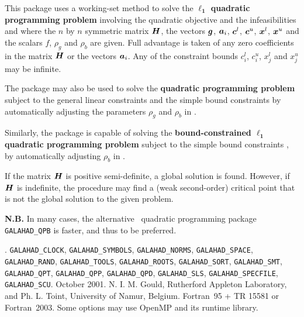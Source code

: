 \documentclass{galahad}
\newcommand{\packagename}{QPA}
\newcommand{\fullpackagename}{\libraryname\_\packagename}
\begin{document}
\galheader


\galsummary
This package uses a working-set method
to solve the {\bf $\mathbf{\ell_1}$ quadratic programming problem}
involving the quadratic objective
and the infeasibilities
and
where the $n$ by $n$ symmetric matrix ${\bm{H}}$, the 
vectors ${\bm{g}}$, ${\bm{a}}_{i}$, ${\bm{c}}^{l}$, ${\bm{c}}^{u}$, ${\bm{x}}^{l}$, ${\bm{x}}^{u}$ 
and the scalars $f$, $\rho_g$ and $\rho_b$ are given.
Full advantage is taken of any zero coefficients in the matrix ${\bm{H}}$ or the
vectors ${\bm{a}}_{i}$. 
Any of the constraint bounds $c_{i}^{l}$, $c_{i}^{u}$, 
$x_{j}^{l}$ and $x_{j}^{u}$ may be infinite.

The package may also be used to solve the {\bf quadratic programming problem}
subject to the general linear constraints
and the simple bound constraints
by automatically adjusting the parameters $\rho_g$ and $\rho_b$ in .

Similarly, the package is capable of solving the 
{\bf bound-constrained $\mathbf{\ell_1}$ quadratic programming problem}
subject to the simple bound constraints ,
by automatically adjusting $\rho_b$ in .

If the matrix ${\bm{H}}$ is positive semi-definite, a global
solution is found. However, if ${\bm{H}}$ is indefinite,
the procedure may find  a (weak second-order) critical point 
that is not the global solution to the given problem.

{\bf N.B.} In many cases, the alternative \galahad\ quadratic 
programming package {\tt GALAHAD\_QPB} is faster, and thus 
to be preferred.


\galattributes
\galversions{\tt  \fullpackagename\_single, \fullpackagename\_double}.
\galuses 
{\tt GALAHAD\_\-CLOCK},
{\tt GALAHAD\_SY\-M\-BOLS}, 
{\tt GALAHAD\-\_NORMS}, 
{\tt GALAHAD\-\_SPACE}, 
{\tt GALAHAD\_RA\-ND}, 
{\tt GALAHAD\_TOOLS}, 
{\tt GALAHAD\_ROOTS}, 
{\tt GALAHAD\_SORT},
{\tt GALAHAD\_\-SMT}, 
{\tt GALAHAD\-\_QPT},
{\tt GALAHAD\_QPP},
{\tt GALAHAD\_QPD},
{\tt GALAHAD\_SLS}, 
{\tt GALAHAD\_SPECFILE}, 
{\tt GALAHAD\_SCU}.
\galdate October 2001.
\galorigin N. I. M. Gould, Rutherford Appleton Laboratory, and
Ph. L. Toint, University of Namur, Belgium.
\gallanguage Fortran~95 + TR 15581 or Fortran~2003. 
\galparallelism Some options may use OpenMP and its runtime library.
\end{document}

